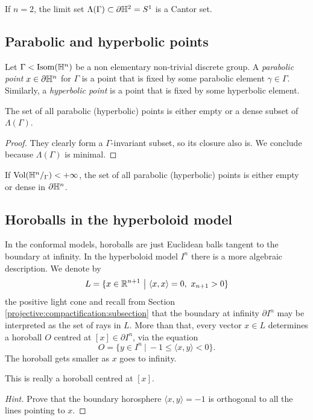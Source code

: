 \begin{ex} If $n=2$, the limit set $\Lambda(\Gamma)\subset \partial \mathbb{H}^2 = S^1$ is a Cantor set.
\end{ex}

\subsection{Parabolic and hyperbolic points}
Let $\Gamma < {\rm Isom}(\mathbb{H}^n)$ be a non elementary non-trivial discrete group. A \emph{parabolic point} $x\in \partial \mathbb{H}^n$ for $\Gamma$ is a point that is fixed by some parabolic element $\gamma \in \Gamma$. Similarly, a \emph{hyperbolic point} is a point that is fixed by some hyperbolic element.

\begin{prop}
The set of all parabolic (hyperbolic) points is either empty or a dense subset of $\Lambda(\Gamma)$.
\end{prop}
\begin{proof}
They clearly form a $\Gamma$-invariant subset, so its closure also is. We conclude because $\Lambda(\Gamma)$ is minimal.
\end{proof}

\begin{cor} \label{parabolic:hyperbolic:dense:cor}
If ${\rm Vol}(\mathbb{H}^n/_\Gamma)<+\infty $, the set of all parabolic (hyperbolic) points is either empty or dense in $\partial \mathbb{H}^n$.
\end{cor}

\subsection{Horoballs in the hyperboloid model}
In the conformal models, horoballs are just Euclidean balls tangent to the boundary at infinity. In the hyperboloid model $I^n$ there is a more algebraic description. We denote by
$$L = \{x\in \mathbb{R}^{n+1}\ \big|\ \langle x,x \rangle = 0, \ x_{n+1}>0\}$$ 
the positive light cone and recall from Section \ref{projective:compactification:subsection} that the boundary at infinity $\partial I^n$ may be interpreted as the set of rays in $L$. More than that, every vector $x\in L$ determines a horoball $O$ centred at $[x]\in\partial I^n$, via the equation
$$O = \big\{y\in I^n \ |\ -1 \leqslant \langle x,y \rangle < 0\big\}.$$
The horoball gets smaller as $x$ goes to infinity.
\begin{ex}
This is really a horoball centred at $[x]$.
\end{ex}
\begin{proof}[Hint]
Prove that the boundary horosphere $\langle x,y \rangle =-1$ is orthogonal to all the lines pointing to $x$. 
\end{proof} 

